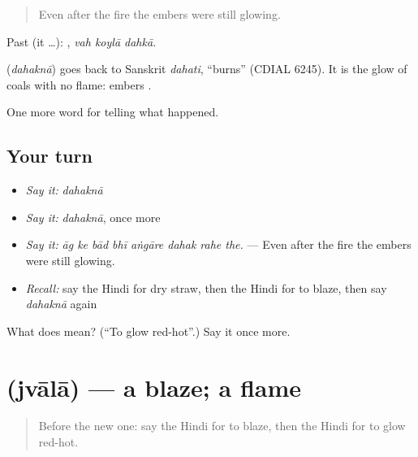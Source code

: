 \begin{quote}
Even after the fire the embers were still glowing.
\end{quote}

Past (it …):   , \emph{vah koylā dahkā}.

\begin{cousinweb}
\textbf{} (\emph{dahaknā}) goes back to Sanskrit \emph{dahati}, \textquotedblleft{}burns\textquotedblright{} (CDIAL 6245). It is the glow of coals with no flame: embers \textbf{ }.
\end{cousinweb}

\begin{grammarlens}[title={What you've built}]
One more word for telling what happened.
\end{grammarlens}

\subsection*{Your turn}
\begin{itemize}
\raggedright
  \item \emph{Say it:} \emph{dahaknā}
  \item \emph{Say it:} \emph{dahaknā}, once more
  \item \emph{Say it:} \emph{āg ke bād bhī aṅgāre dahak rahe the.} — Even after the fire the embers were still glowing.
  \item \emph{Recall:} say the Hindi for dry straw, then the Hindi for to blaze, then say \emph{dahaknā} again
\end{itemize}

\begin{tcolorbox}[breakable,colback=teal!4,colframe=teal!35!black,title={Before you move on}]
What does  mean? (\textquotedblleft{}To glow red-hot\textquotedblright{}.) Say it once more.
\end{tcolorbox}
\section[\texorpdfstring{\hi{ज्वाला} (jvālā)}{ज्वाला (jvālā)}]{ (jvālā) — a blaze; a flame}

\label{lesson:HI-C300-jvala}



\begin{quote}
Before the new one: say the Hindi for to blaze, then the Hindi for to glow red-hot.
\end{quote}

